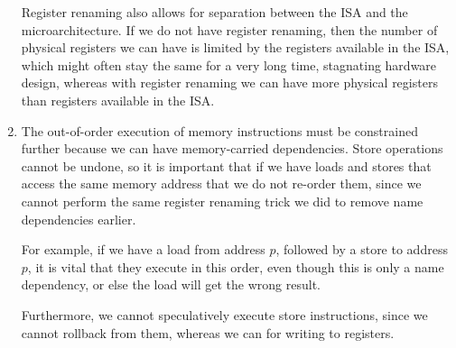 \begin{enumerate}[label=(\alph*)]
  Register renaming also allows for separation between the ISA and the microarchitecture. If we do not have register renaming, then the number of physical registers we can have is limited by the registers available in the ISA, which might often stay the same for a very long time, stagnating hardware design, whereas with register renaming we can have more physical registers than registers available in the ISA.

\item
  The out-of-order execution of memory instructions must be constrained further because we can have memory-carried dependencies. Store operations cannot be undone, so it is important that if we have loads and stores that access the same memory address that we do not re-order them, since we cannot perform the same register renaming trick we did to remove name dependencies earlier.

  For example, if we have a load from address $p$, followed by a store to address $p$, it is vital that they execute in this order, even though this is only a name dependency, or else the load will get the wrong result.

  Furthermore, we cannot speculatively execute store instructions, since we cannot rollback from them, whereas we can for writing to registers.



\end{enumerate}

